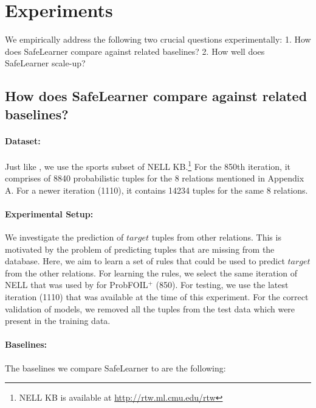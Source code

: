 \documentclass[akbc,twoside,11pt]{article}
\newcommand{\algorithmname}{SafeLearner\xspace}
\begin{document}
\section{Experiments}
\label{sec:exp}
We empirically address the following two crucial questions experimentally: 1. How does \algorithmname compare against related baselines? 2. How well does \algorithmname scale-up?


\subsection{How does \algorithmname compare against related baselines?} \label{exp1}

\paragraph{Dataset:}
Just like \citet{DBLP:conf/ijcai/RaedtDTBV15}, we use the sports subset of NELL KB.\footnote{NELL KB is available at \url{http://rtw.ml.cmu.edu/rtw}} For the 850th iteration, it comprises of 8840 probabilistic tuples for the 8 relations mentioned in Appendix A. %
For a newer iteration (1110), it contains 14234 tuples for the same 8 relations.

\paragraph{Experimental Setup:}
We investigate the prediction of $target$ tuples from other relations. This is motivated by the problem of predicting tuples that are missing from the database. Here, we aim to learn a set of rules that could be used to predict $target$ from the other relations.
For learning the rules, we select the same iteration of NELL that was used by \citet{DBLP:conf/ijcai/RaedtDTBV15} for ProbFOIL$^+$ (850). For testing, we use the latest iteration (1110) that was available at the time of this experiment. For the correct validation of models, we removed all the tuples from the test data which were present in the training data.

\paragraph{Baselines:}
The baselines we compare \algorithmname to are the following:
\end{document}
